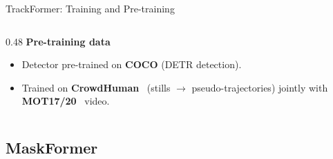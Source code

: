 \begin{frame}[fragile]{TrackFormer: Training and Pre-training}
\begin{columns}[T]
\begin{column}{0.48\textwidth}
      \vspace{0.2em}
      \textbf{Pre-training data}
      \begin{itemize}
        \item Detector pre-trained on \textbf{COCO} (DETR detection).
        \item Trained on \textbf{CrowdHuman}~\cite{shao2018crowdhuman} (stills $\to$ pseudo-trajectories) jointly with \textbf{MOT17/20}~\cite{milan2016mot16} video.
      \end{itemize}
    \end{column}
  \end{columns}
\end{frame}

\subsection{MaskFormer}

